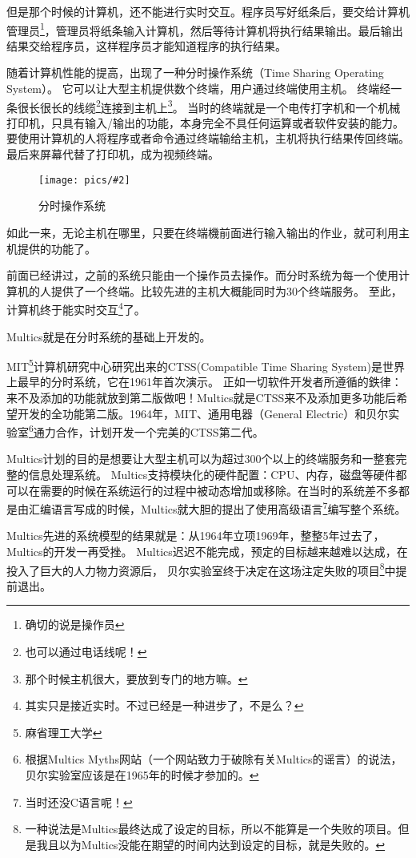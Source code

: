 \documentclass[amstex]{ctexbook}
\newenvironment{insertnote}{ \ttfamily\CJKfamily{KaiTi} }{\vskip 1cm }
\newcommand{\chatu}[3][0.35]{%
\begin{figure}[h]%
\centering%
\texttt{[image: pics/\#2]}%
\caption{#3\label{fig:#2}}%
\end{figure}%
}
\begin{document}
\begin{insertnote}
但是那个时候的计算机，还不能进行实时交互。程序员写好纸条后，要交给计算机管理员\footnote{确切的说是操作员}，管理员将纸条输入计算机，然后等待计算机将执行结果输出。最后输出结果交给程序员，这样程序员才能知道程序的执行结果。


随着计算机性能的提高，出现了一种分时操作系统（Time Sharing Operating System）。 
它可以让大型主机提供数个终端，用户通过终端使用主机。
终端经一条很长很长的线缆\footnote{也可以通过电话线呢！}连接到主机上\footnote{那个时候主机很大，要放到专门的地方嘛。}。
当时的终端就是一个电传打字机和一个机械打印机，只具有输入/输出的功能，本身完全不具任何运算或者软件安装的能力。要使用计算机的人将程序或者命令通过终端输给主机，主机将执行结果传回终端。最后来屏幕代替了打印机，成为视频终端。

\chatu[0.8]{ctss}{分时操作系统}

如此一来，无论主机在哪里，只要在终端機前面进行输入输出的作业，就可利用主机提供的功能了。

前面已经讲过，之前的系统只能由一个操作员去操作。而分时系统为每一个使用计算机的人提供了一个终端。比较先进的主机大概能同时为30个终端服务。 至此，计算机终于能实时交互\footnote{其实只是接近实时。不过已经是一种进步了，不是么？}了。

Multics就是在分时系统的基础上开发的。

\end{insertnote}

MIT\footnote{麻省理工大学}计算机研究中心研究出来的CTSS(Compatible Time Sharing System)是世界上最早的分时系统，它在1961年首次演示。
正如一切软件开发者所遵循的鉄律：来不及添加的功能就放到第二版做吧！Multics就是CTSS来不及添加更多功能后希望开发的全功能第二版。1964年，MIT、通用电器（General Electric）和贝尔实验室\footnote{根据Multics Myths网站（一个网站致力于破除有关Multics的谣言）的说法，贝尔实验室应该是在1965年的时候才参加的。
}通力合作，计划开发一个完美的CTSS第二代。

Multics计划的目的是想要让大型主机可以\textbf{}为超过300个以上的终端服务和一整套完整的信息处理系统。
Multics支持模块化的硬件配置：CPU、内存，磁盘等硬件都可以在需要的时候在系统运行的过程中被动态增加或移除。在当时的系统差不多都是由汇编语言写成的时候，Multics就大胆的提出了使用高级语言\footnote{当时还没C语言呢！}编写整个系统。

Multics先进的系统模型的结果就是：从1964年立项1969年，整整5年过去了，Multics的开发一再受挫。
Multics迟迟不能完成，预定的目标越来越难以达成，在投入了巨大的人力物力资源后，
贝尔实验室终于决定在这场注定失败的项目\footnote{一种说法是Multics最终达成了设定的目标，所以不能算是一个失败的项目。但是我且以为Multics没能在期望的时间内达到设定的目标，就是失败的。}中提前退出。
\end{document}
